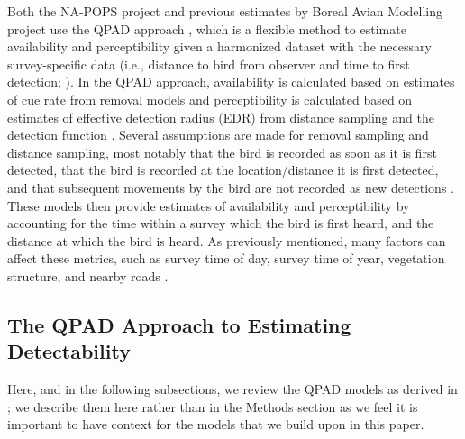 \documentclass[12pt]{article}
\begin{document}
\par Both the NA-POPS project and previous estimates by Boreal Avian Modelling project use the QPAD approach \citep{solymos_calibrating_2013}, which is a flexible method to estimate availability and perceptibility given a harmonized dataset \citep{barker_ecological_2015} with the necessary survey-specific data (i.e., distance to bird from observer and time to first detection; \citet{barker_ecological_2015}).
In the QPAD approach, availability is calculated based on estimates of cue rate from removal models \citep{farnsworth_removal_2002, alldredge_time--detection_2007} and perceptibility is calculated based on estimates of effective detection radius (EDR) from distance sampling and the detection function \citep{buckland_introduction_2001}.
Several assumptions are made for removal sampling and distance sampling, most notably that the bird is recorded as soon as it is first detected, that the bird is recorded at the location/distance it is first detected, and that subsequent movements by the bird are not recorded as new detections \citep{buckland_distance_2015, farnsworth_removal_2002, alldredge_time--detection_2007}.
These models then provide estimates of availability and perceptibility by accounting for the time within a survey which the bird is first heard, and the distance at which the bird is heard.
As previously mentioned, many factors can affect these metrics, such as survey time of day, survey time of year, vegetation structure, and nearby roads \citep{edwards_point_2023}.

\subsection{The QPAD Approach to Estimating Detectability}
\par Here, and in the following subsections, we review the QPAD models as derived in \citet{solymos_calibrating_2013}; we describe them here rather than in the Methods section as we feel it is important to have context for the models that we build upon in this paper.
\end{document}
